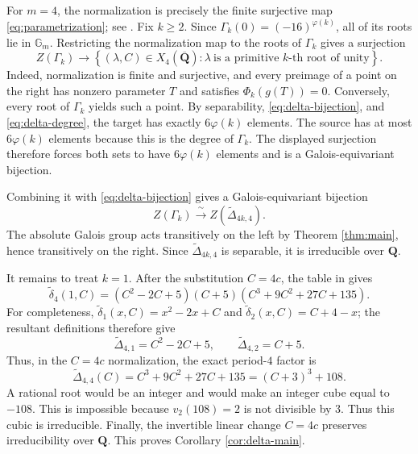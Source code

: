\documentclass[11pt]{article}
\newcommand{\Q}{\mathbf Q}
\begin{document}
For $m=4$, the normalization is precisely the finite surjective map
\eqref{eq:parametrization}; see
\cite[Remark 2.10]{KoizumiMurakamiSanoTakehira2025}.  Fix $k\geq2$.
Since $\Gamma_k(0)=(-16)^{\varphi(k)}$, all of its roots lie in
$\mathbb G_m$.  Restricting the normalization
map to the roots of $\Gamma_k$ gives a surjection
\begin{equation}\label{eq:normalization-surjection}
 Z(\Gamma_k)\longrightarrow
 \left\{(\lambda,C)\in X_4(\overline{\Q}):
       \lambda\ \text{is a primitive $k$-th root of unity}\right\}.
\end{equation}
Indeed, normalization is finite and surjective, and every preimage of a
point on the right has nonzero parameter $T$ and satisfies
$\Phi_k(g(T))=0$.  Conversely, every root of $\Gamma_k$ yields such a
point.  By separability, \eqref{eq:delta-bijection}, and
\eqref{eq:delta-degree}, the target has exactly $6\varphi(k)$ elements.
The source has at most $6\varphi(k)$ elements because this is the degree
of $\Gamma_k$.  The displayed surjection therefore forces both sets to
have $6\varphi(k)$ elements and is a Galois-equivariant bijection.

Combining it with \eqref{eq:delta-bijection} gives a Galois-equivariant
bijection
\[
 Z(\Gamma_k)\xrightarrow{\ \sim\ }
 Z(\widetilde\Delta_{4k,4}).
\]
The absolute Galois group acts transitively on the left by
Theorem \ref{thm:main}, hence transitively on the right.  Since
$\widetilde\Delta_{4k,4}$ is separable, it is irreducible over $\Q$.

It remains to treat $k=1$.  After the substitution $C=4c$, the table in
\cite[Section 3, Table 1]{MortonVivaldi1995} gives
\[
 \widetilde\delta_4(1,C)
 =(C^2-2C+5)(C+5)(C^3+9C^2+27C+135).
\]
For completeness,
$\widetilde\delta_1(x,C)=x^2-2x+C$ and
$\widetilde\delta_2(x,C)=C+4-x$; the resultant definitions therefore
give
\[
 \widetilde\Delta_{4,1}=C^2-2C+5,
 \qquad
 \widetilde\Delta_{4,2}=C+5.
\]
Thus, in the $C=4c$ normalization, the exact period-$4$ factor is
\[
 \widetilde\Delta_{4,4}(C)
 =C^3+9C^2+27C+135
 =(C+3)^3+108.
\]
A rational root would be an integer and would make an integer cube equal
to $-108$.  This is impossible because $v_2(108)=2$ is not divisible by
$3$.  Thus this cubic is irreducible.  Finally, the invertible linear
change $C=4c$ preserves irreducibility over $\Q$.
This proves Corollary \ref{cor:delta-main}.



\end{document}

